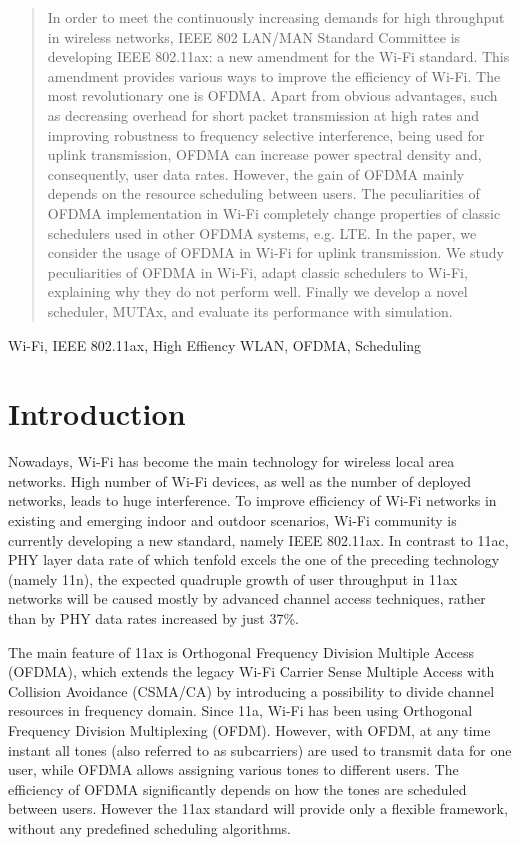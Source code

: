 \begin{abstract}
In order to meet the continuously increasing demands for high throughput in wireless networks, IEEE 802 LAN/MAN Standard Committee is developing IEEE 802.11ax: a new amendment for the Wi-Fi standard.
This amendment provides various ways to improve the efficiency of Wi-Fi. The most revolutionary one is OFDMA.
Apart from obvious advantages, such as decreasing overhead for short packet transmission at high rates and improving robustness to frequency selective interference, being used for uplink transmission, OFDMA can increase power spectral density and, consequently, user data rates. However, the gain of OFDMA mainly depends on the resource scheduling between users.
The peculiarities of OFDMA implementation in Wi-Fi completely change properties of classic schedulers used in other OFDMA systems, e.g. LTE. 
In the paper, we consider the usage of OFDMA in Wi-Fi for uplink transmission.
We study peculiarities of OFDMA in Wi-Fi, adapt classic schedulers to Wi-Fi, explaining why they do not perform well.
Finally we develop a novel scheduler, MUTAx, and evaluate its performance with simulation. 
\end{abstract}

\begin{IEEEkeywords}
Wi-Fi, IEEE 802.11ax, High Effiency WLAN, OFDMA, Scheduling
\end{IEEEkeywords}

\section{Introduction}
Nowadays, Wi-Fi has become the main technology for wireless local area networks. High number of Wi-Fi devices, as well as the number of deployed networks, leads to huge interference. To improve efficiency of Wi-Fi networks in existing and emerging indoor and outdoor scenarios, Wi-Fi community is currently developing a new standard, namely IEEE 802.11ax. 
In contrast to 11ac, PHY layer data rate of which tenfold excels the one of the preceding technology (namely 11n), the expected quadruple growth of user throughput in 11ax networks will be caused mostly by advanced channel access techniques, rather than by PHY data rates increased by just 37\%.

The main feature of 11ax is Orthogonal Frequency Division Multiple Access (OFDMA), which extends the legacy Wi-Fi Carrier Sense Multiple Access with Collision Avoidance (CSMA/CA) by introducing a possibility to divide channel resources in frequency domain. Since 11a, Wi-Fi has been using Orthogonal Frequency Division Multiplexing (OFDM). However, with OFDM, at any time instant all tones (also referred to as subcarriers) are used to transmit data for one user, while OFDMA allows assigning various tones to different users. The efficiency of OFDMA significantly depends on how the tones are scheduled between users. However the 11ax standard will provide only a flexible framework, without any predefined scheduling algorithms. 


